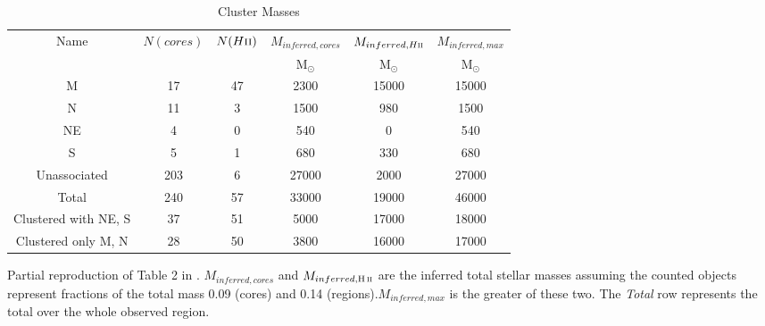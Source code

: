 \begin{table*}[htp]
\centering
\caption{Cluster Masses}
\begin{tabular}{cccccc}
\label{tab:clustermassestimates}
Name & $N(cores)$ & $N(H\textsc{ii})$ & $M_{inferred, cores}$ & $M_{inferred, H\textsc{ii}}$ & $M_{inferred,max}$ \\
 &  &  & $\mathrm{M_{\odot}}$ & $\mathrm{M_{\odot}}$ & $\mathrm{M_{\odot}}$ \\
\hline
M & 17 & 47 & 2300 & 15000 & 15000 \\
N & 11 & 3 & 1500 & 980 & 1500 \\
NE & 4 & 0 & 540 & 0 & 540 \\
S & 5 & 1 & 680 & 330 & 680 \\
Unassociated & 203 & 6 & 27000 & 2000 & 27000 \\
Total & 240 & 57 & 33000 & 19000 & 46000 \\
Clustered with NE, S & 37 & 51 & 5000 & 17000 & 18000 \\
Clustered only M, N & 28 & 50 & 3800 & 16000 & 17000 \\
\hline
\end{tabular}
\par
Partial reproduction of Table 2 in \citet{Ginsburg2017c}. $M_{inferred,cores}$ and $M_{inferred,\hii}$ are the inferred total stellar masses assuming the counted objects represent fractions of the total mass 0.09 (cores) and 0.14 (\hii regions).$M_{inferred,max}$ is the greater of these two.    The \emph{Total} row represents the total over the whole observed region.  
\end{table*}
